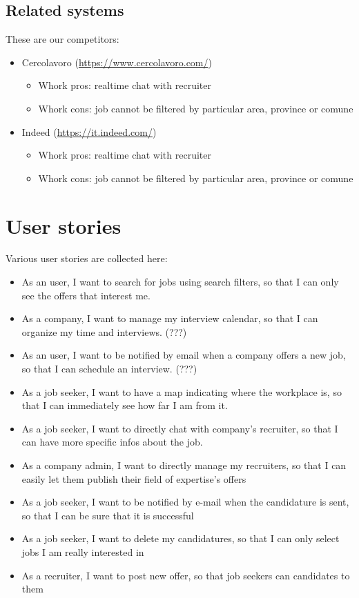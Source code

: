 \documentclass[12pt, a4paper]{article}
\begin{document}
\subsection{Related systems}
These are our competitors:
\begin{itemize}
	\item Cercolavoro (\url{https://www.cercolavoro.com/})
	\begin{itemize}
		\item Whork pros: realtime chat with recruiter
		\item Whork cons: job cannot be filtered by particular area, province or comune
	\end{itemize}
	\item Indeed (\url{https://it.indeed.com/})
	\begin{itemize}
		\item Whork pros: realtime chat with recruiter
		\item Whork cons: job cannot be filtered by particular area, province or comune
	\end{itemize}
\end{itemize}

\section{User stories}
Various user stories are collected here:
\begin{itemize}
	\item As an user, I want to search for jobs using search filters,
		so that I can only see the offers that interest me.
	\item As a company, I want to manage my interview calendar, 
		so that I can organize my time and interviews. (???)
	\item As an user, I want to be notified by email when a company 
		offers a new job, so that I can schedule an interview. (???)
	\item As a job seeker, I want to have a map indicating where the workplace is,
		so that I can immediately see how far I am from it.
	\item As a job seeker, I want to directly chat with company's recruiter,
		so that I can have more specific infos about the job.
	\item As a company admin, I want to directly manage my recruiters,
		so that I can easily let them publish their field of expertise's offers
	\item As a job seeker, I want to be notified by e-mail when the candidature is sent, 
		so that I can be sure that it is successful
	\item As a job seeker, I want to delete my candidatures, 
		so that I can only select jobs I am really interested in
	\item As a recruiter, I want to post new offer, so that job seekers can candidates to them
\end{itemize}
\end{document}
